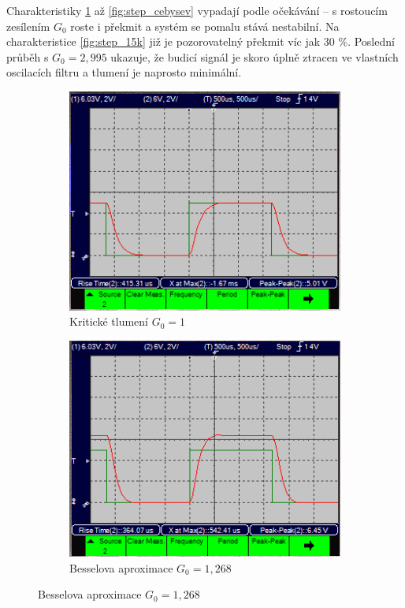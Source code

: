 \documentclass[twoside]{article}
\begin{document}
Charakteristiky \ref{fig:step_kriticke} až \ref{fig:step_cebysev} vypadají podle očekávání -- 
s rostoucím zesílením $G_0$ roste i překmit a systém se pomalu stává nestabilní. Na charakteristice 
\ref{fig:step_15k} již je pozorovatelný překmit víc jak 30 \%. Poslední průběh s $G_0 = 2,995$ ukazuje,
že budicí signál je skoro úplně ztracen ve vlastních oscilacích filtru a tlumení je naprosto minimální.

\begin{figure}[h!]
    \centering
    \begin{subfigure}{0.48\textwidth}
        \centering
        \includegraphics[width=1\linewidth]{step_kriticke.png}
        \caption{Kritické tlumení $G_0 = 1$}
        \label{fig:step_kriticke}
    \end{subfigure}
    \begin{subfigure}{0.48\textwidth}
        \centering
        \includegraphics[width=1\linewidth]{step_bessel.png}
        \caption{Besselova aproximace $G_0 = 1,268$}
        \label{fig:step_bessel}
    \end{subfigure}


\end{figure}
\end{document}

